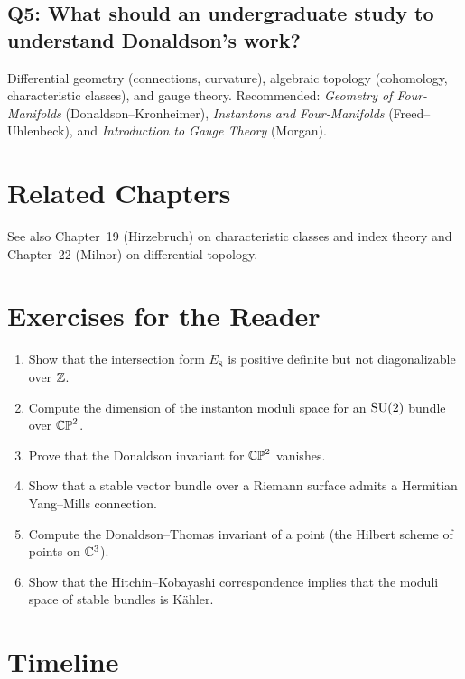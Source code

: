 \subsection*{Q5: What should an undergraduate study to understand Donaldson's work?}
Differential geometry (connections, curvature), algebraic topology (cohomology, characteristic classes), and gauge theory. Recommended: \textit{Geometry of Four-Manifolds} (Donaldson--Kronheimer), \textit{Instantons and Four-Manifolds} (Freed--Uhlenbeck), and \textit{Introduction to Gauge Theory} (Morgan).

\section{Related Chapters}
See also Chapter~19 (Hirzebruch) on characteristic classes and index theory and Chapter~22 (Milnor) on differential topology.

\section*{Exercises for the Reader}

\begin{enumerate}
    \item [B] Show that the intersection form $E_8$ is positive definite but not diagonalizable over $\mathbb{Z}$.
    \item [I] Compute the dimension of the instanton moduli space for an $\operatorname{SU}(2)$ bundle over $\mathbb{CP}^2$.
    \item [I] Prove that the Donaldson invariant for $\mathbb{CP}^2$ vanishes.
    \item [A] Show that a stable vector bundle over a Riemann surface admits a Hermitian Yang--Mills connection.
    \item [A] Compute the Donaldson--Thomas invariant of a point (the Hilbert scheme of points on $\mathbb{C}^3$).
    \item [A] Show that the Hitchin--Kobayashi correspondence implies that the moduli space of stable bundles is K\"ahler.
\end{enumerate}

\section*{Timeline}

